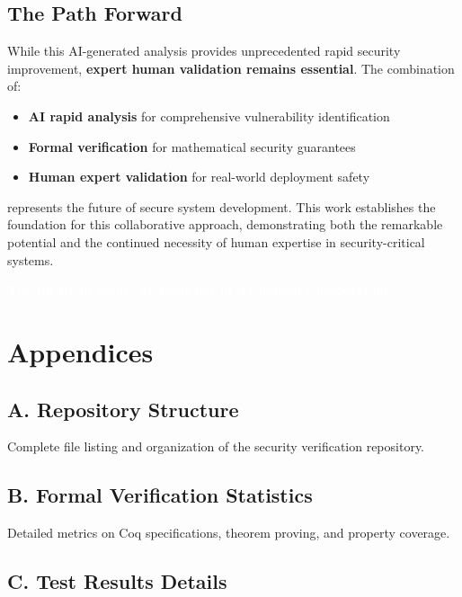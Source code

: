 \documentclass[11pt,a4paper]{article}
\begin{document}
\subsection{The Path Forward}

While this AI-generated analysis provides unprecedented rapid security improvement, \textbf{expert human validation remains essential}. The combination of:

\begin{itemize}
    \item \textbf{AI rapid analysis} for comprehensive vulnerability identification
    \item \textbf{Formal verification} for mathematical security guarantees
    \item \textbf{Human expert validation} for real-world deployment safety
\end{itemize}

represents the future of secure system development. This work establishes the foundation for this collaborative approach, demonstrating both the remarkable potential and the continued necessity of human expertise in security-critical systems.

\begin{center}
\colorbox{successgreen}{\textcolor{white}{\textbf{The future of secure systems lies in AI-human collaboration}}}
\end{center}

\section{Appendices}

\subsection{A. Repository Structure}

Complete file listing and organization of the security verification repository.

\subsection{B. Formal Verification Statistics}

Detailed metrics on Coq specifications, theorem proving, and property coverage.

\subsection{C. Test Results Details}
\end{document}
